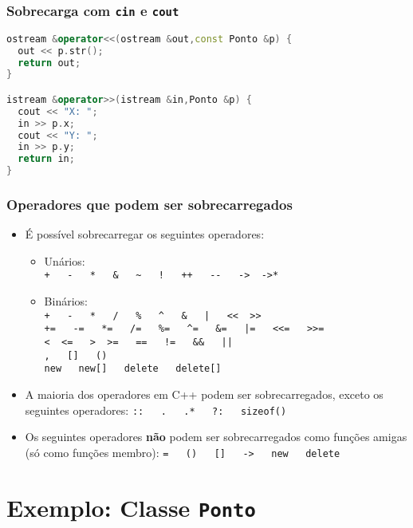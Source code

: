 \documentclass[aspectratio=169]{beamer}
\begin{document}
\begin{frame}[fragile]\frametitle{Sobrecarga com \texttt{cin} e \texttt{cout}}
\begin{lstlisting}[language=C++,basicstyle=\ttfamily]
ostream &operator<<(ostream &out,const Ponto &p) {
  out << p.str();
  return out;
}

istream &operator>>(istream &in,Ponto &p) {
  cout << "X: ";
  in >> p.x;
  cout << "Y: ";
  in >> p.y;
  return in;
}
\end{lstlisting}
\end{frame}

\begin{frame}\frametitle{Operadores que podem ser sobrecarregados}
\begin{itemize}
	\item É possível sobrecarregar os seguintes operadores:
	\begin{itemize}
		\item Unários:\\
		\texttt{+ ~ - ~ * ~ \& ~ \~{} ~ ! ~ ++ ~ -{}- ~ -\textgreater ~ -\textgreater{}*}
		\item Binários:\\
		\texttt{+ ~ - ~ * ~ / ~ \% ~ \^{} ~ \& ~ | ~ \textless{}\textless ~ \textgreater{}\textgreater{}\\
		+= ~ -= ~ *= ~ /= ~ \%= ~ \^{}= ~ \&= ~ |= ~ \textless{}\textless= ~ \textgreater{}\textgreater=\\
		\textless ~ \textless= ~ \textgreater ~ \textgreater= ~ == ~ != ~ \&\& ~ ||\\
		, ~ [] ~ ()\\
		new ~ new[] ~ delete ~ delete[]}
	\end{itemize}
	\item A  maioria  dos  operadores  em  C++ podem  ser  sobrecarregados,  exceto  os  seguintes operadores: \texttt{:: ~ . ~ .* ~ ?: ~ sizeof()}
	\item Os seguintes operadores \textbf{não} podem ser sobrecarregados como funções amigas (só como funções membro): \texttt{= ~ () ~ [] ~ -> ~ new ~ delete}
\end{itemize}
\end{frame}

\section{Exemplo: Classe \texttt{Ponto}}
\end{document}

